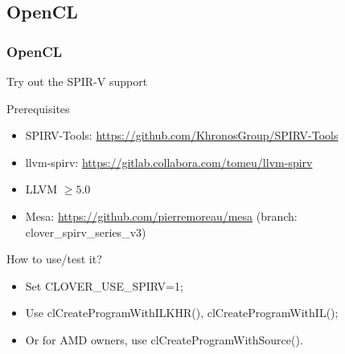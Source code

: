 \documentclass[11pt,english,compress]{beamer}
\begin{document}
\subsection{OpenCL}
\begin{frame}
	\frametitle{OpenCL}

	\begin{block}{}
	\end{block}

\end{frame}

\begin{frame}{Try out the SPIR-V support}
	\begin{block}{Prerequisites}
		\begin{itemize}
			\item SPIRV-Tools:
				\url{https://github.com/KhronosGroup/SPIRV-Tools}
			\item llvm-spirv:
				\url{https://gitlab.collabora.com/tomeu/llvm-spirv}
			\item LLVM $\geq 5.0$
			\item Mesa: \url{https://github.com/pierremoreau/mesa}
				(branch: clover\_spirv\_series\_v3)
		\end{itemize}
	\end{block}
	\begin{block}{How to use/test it?}
		\begin{itemize}
			\item Set CLOVER\_USE\_SPIRV=1;
			\item Use clCreateProgramWithILKHR(), clCreateProgramWithIL();
			\item Or for AMD owners, use clCreateProgramWithSource().
		\end{itemize}
	\end{block}
\end{frame}
\end{document}

